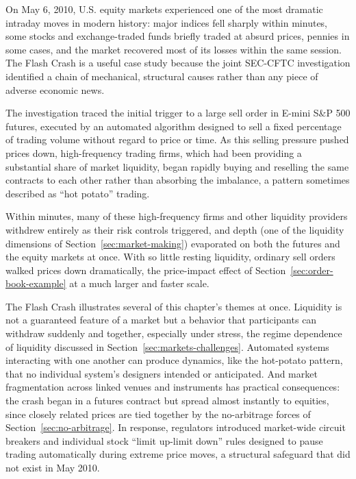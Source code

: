 \documentclass[../ai_in_finance]{subfiles}
\begin{document}

On May 6, 2010, U.S. equity markets experienced one of the most dramatic intraday moves in modern history: major indices fell sharply within minutes, some stocks and exchange-traded funds briefly traded at absurd prices, pennies in some cases, and the market recovered most of its losses within the same session. The Flash Crash is a useful case study because the joint SEC-CFTC investigation identified a chain of mechanical, structural causes rather than any piece of adverse economic news.

The investigation traced the initial trigger to a large sell order in E-mini S\&P 500 futures, executed by an automated algorithm designed to sell a fixed percentage of trading volume without regard to price or time. As this selling pressure pushed prices down, high-frequency trading firms, which had been providing a substantial share of market liquidity, began rapidly buying and reselling the same contracts to each other rather than absorbing the imbalance, a pattern sometimes described as ``hot potato'' trading.

Within minutes, many of these high-frequency firms and other liquidity providers withdrew entirely as their risk controls triggered, and depth (one of the liquidity dimensions of Section~\ref{sec:market-making}) evaporated on both the futures and the equity markets at once. With so little resting liquidity, ordinary sell orders walked prices down dramatically, the price-impact effect of Section~\ref{sec:order-book-example} at a much larger and faster scale.

The Flash Crash illustrates several of this chapter's themes at once. Liquidity is not a guaranteed feature of a market but a behavior that participants can withdraw suddenly and together, especially under stress, the regime dependence of liquidity discussed in Section~\ref{sec:markets-challenges}. Automated systems interacting with one another can produce dynamics, like the hot-potato pattern, that no individual system's designers intended or anticipated.
And market fragmentation across linked venues and instruments has practical consequences: the crash began in a futures contract but spread almost instantly to equities, since closely related prices are tied together by the no-arbitrage forces of Section~\ref{sec:no-arbitrage}. In response, regulators introduced market-wide circuit breakers and individual stock ``limit up-limit down'' rules designed to pause trading automatically during extreme price moves, a structural safeguard that did not exist in May 2010.
\end{document}
